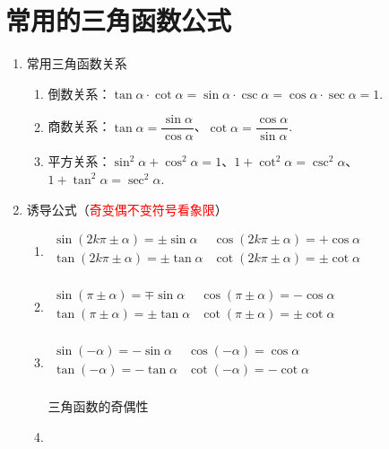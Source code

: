 \documentclass[lang=cn,10pt]{elegantbook}
\begin{document}
\chapter{常用的三角函数公式}
\begin{enumerate}
	\item 常用三角函数关系
	\begin{enumerate}
		\item 倒数关系：\( \tan \alpha \cdot \cot \alpha = \sin \alpha \cdot \csc \alpha = \cos \alpha \cdot \sec \alpha = 1 \).
		\\
		\item 商数关系：\( \tan \alpha = \dfrac{\sin \alpha}{\cos \alpha} \)、\( \cot \alpha = \dfrac{\cos\alpha}{\sin\alpha} \).
		\\
		\item 平方关系：\( \sin^{2}\alpha + \cos^{2}\alpha = 1 \)、\( 1 + \cot^{2}\alpha = \csc^{2}\alpha \)、\( 1 + \tan^{2}\alpha = \sec^{2}\alpha \).
	\end{enumerate}
	\item 诱导公式（\textcolor{red}{奇变偶不变符号看象限}）
	\begin{enumerate}
		\item 
		\( \begin{array}{ll}
			\sin(2k\pi \pm \alpha) =\pm \sin \alpha & \cos(2k\pi \pm \alpha) = + \cos \alpha \\
			\tan(2k\pi \pm \alpha) =\pm \tan \alpha & \cot(2k\pi\pm \alpha) = \pm \cot \alpha \\
		\end{array}
		\)
		\item 
		\(
			\begin{array}{ll}
				\sin(\pi \pm \alpha) =  \mp \sin \alpha & \cos(\pi \pm \alpha) = - \cos \alpha \\
				\tan(\pi \pm \alpha) = \pm \tan \alpha & \cot(\pi \pm \alpha) = \pm \cot \alpha \\		
			\end{array}
		\)
		\item
		\(
			\begin{array}{ll}
				\sin(-\alpha) = -\sin\alpha & \cos(-\alpha) = \cos\alpha \\
				\tan(-\alpha) = -\tan\alpha & \cot(-\alpha) = -\cot \alpha \\
			\end{array}
		\)
		\begin{remark}
			三角函数的{\heiti 奇偶性}
		\end{remark}
		\item 

\end{enumerate}
\end{enumerate}
\end{document}
